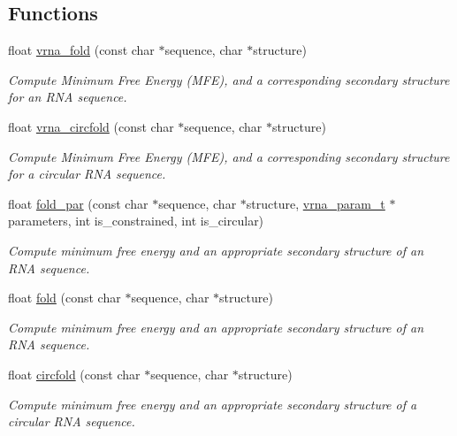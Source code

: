 \subsection*{Functions}
\begin{DoxyCompactItemize}
\item 
float \mbox{\hyperlink{group__mfe__fold__single_ga29a33b2895f4e67b0480271ff289afdc}{vrna\+\_\+fold}} (const char $\ast$sequence, char $\ast$structure)
\begin{DoxyCompactList}\small\item\em Compute Minimum Free Energy (M\+FE), and a corresponding secondary structure for an R\+NA sequence. \end{DoxyCompactList}\item 
float \mbox{\hyperlink{group__mfe__fold__single_gaf973483d8acbc8cc9aacfc8a9b7f0074}{vrna\+\_\+circfold}} (const char $\ast$sequence, char $\ast$structure)
\begin{DoxyCompactList}\small\item\em Compute Minimum Free Energy (M\+FE), and a corresponding secondary structure for a circular R\+NA sequence. \end{DoxyCompactList}\item 
float \mbox{\hyperlink{group__mfe__fold__single_ga2bc41df5d71fee6fd8da9904ee65d8fb}{fold\+\_\+par}} (const char $\ast$sequence, char $\ast$structure, \mbox{\hyperlink{group__energy__parameters_ga8a69ca7d787e4fd6079914f5343a1f35}{vrna\+\_\+param\+\_\+t}} $\ast$parameters, int is\+\_\+constrained, int is\+\_\+circular)
\begin{DoxyCompactList}\small\item\em Compute minimum free energy and an appropriate secondary structure of an R\+NA sequence. \end{DoxyCompactList}\item 
float \mbox{\hyperlink{group__mfe__fold__single_gaadafcb0f140795ae62e5ca027e335a9b}{fold}} (const char $\ast$sequence, char $\ast$structure)
\begin{DoxyCompactList}\small\item\em Compute minimum free energy and an appropriate secondary structure of an R\+NA sequence. \end{DoxyCompactList}\item 
float \mbox{\hyperlink{group__mfe__fold__single_ga4ac63ab3e8d9a80ced28b8052d94e423}{circfold}} (const char $\ast$sequence, char $\ast$structure)
\begin{DoxyCompactList}\small\item\em Compute minimum free energy and an appropriate secondary structure of a circular R\+NA sequence. \end{DoxyCompactList}\item 

\end{DoxyCompactItemize}

